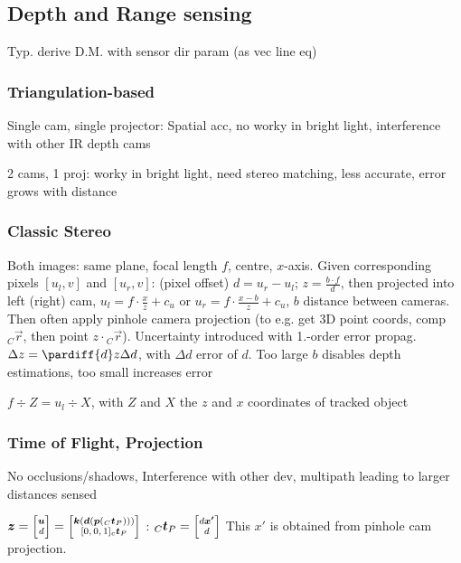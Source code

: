 \subsection{Depth and Range sensing}
Typ. derive D.M. with sensor dir param (as vec line eq)
\subsubsection{Triangulation-based}
 Single cam, single projector: {\color{ForestGreen}Spatial acc}, {\color{red} no worky in bright light, interference with other IR depth cams}

 2 cams, 1 proj: {\color{ForestGreen} worky in bright light}, {\color{red} need stereo matching, less accurate, error grows with distance}


\subsubsection{Classic Stereo}
\label{sec:classic-stereo}
Both images: same plane, focal length $f$, centre, $x$-axis. Given corresponding pixels $[u_l, v]$ and $[u_r, v]$:  (pixel offset) $d = u_r - u_l$;
$z = \frac{b \cdot f}{d}$, then projected into left (right) cam, $u_l = f\cdot \frac{x}{z} + c_u$ or $u_r = f \cdot \frac{x - b}{z} + c_u$, $b$ distance between cameras.
Then often apply pinhole camera projection (to e.g. get 3D point coords, comp ${_C}\vec{r}$, then point $z \cdot {_C}\vec{r}$).
Uncertainty introduced with 1.-order error propag. $\Delta z = \pardiff{d}z \Delta d$, with $\Delta d$ error of $d$.
Too large $b$ disables depth estimations, too small increases error

\shorttheorem[Intercept] $f \div Z = u_l \div X$, with $Z$ and $X$ the $z$ and $x$ coordinates of tracked object


\subsubsection{Time of Flight, Projection}
{\color{ForestGreen}No occlusions/shadows}, {\color{red}Interference with other dev, multipath leading to larger distances sensed}

 $\vec{z} =
    {\scriptsize
    \begin{bmatrix}
        \vec{u} \\ d
    \end{bmatrix} =
    \begin{bmatrix}
        \vec{k}(\vec{d}(\vec{p}({_C}\vec{t}_P))) \\
        [0, 0, 1] {_c}\vec{t}_P
    \end{bmatrix}
    }$
: ${_C}\vec{t}_P
        =
        {\scriptsize
            \begin{bmatrix}
                d \vec{x'} \\d
            \end{bmatrix}
        }$
This $x'$ is obtained from pinhole cam projection.


